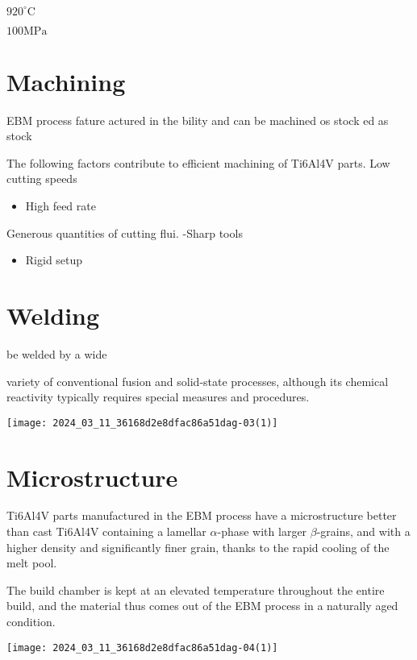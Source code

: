 \documentclass[10pt]{article}
\begin{document}
$920^{\circ} \mathrm{C}$

$100 \mathrm{MPa}$

\section*{Machining}
EBM process fature actured in the bility and can be machined os stock ed as stock

The following factors contribute to efficient machining of Ti6Al4V parts. Low cutting speeds

\begin{itemize}
  \item High feed rate
\end{itemize}

Generous quantities of cutting flui. -Sharp tools

\begin{itemize}
  \item Rigid setup
\end{itemize}

\section*{Welding}
be welded by a wide

variety of conventional fusion and solid-state processes, although its chemical reactivity typically requires special measures and procedures.

\begin{center}
\texttt{[image: 2024\_03\_11\_36168d2e8dfac86a51dag-03(1)]}
\end{center}

\section*{Microstructure}
Ti6Al4V parts manufactured in the EBM process have a microstructure better than cast Ti6Al4V containing a lamellar $\alpha$-phase with larger $\beta$-grains, and with a higher density and significantly finer grain, thanks to the rapid cooling of the melt pool.

The build chamber is kept at an elevated temperature throughout the entire build, and the material thus comes out of the EBM process in a naturally aged condition.

\begin{center}
\texttt{[image: 2024\_03\_11\_36168d2e8dfac86a51dag-04(1)]}
\end{center}
\end{document}
